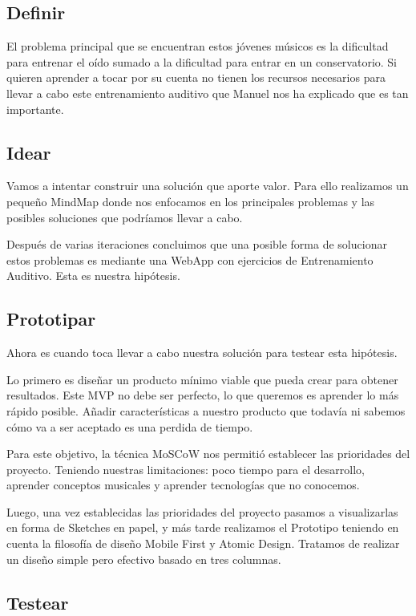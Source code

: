 \documentclass[12pt,twoside,titlepage]{report}
\begin{document}
{\subsection{Definir}

El problema principal que se encuentran estos jóvenes músicos es la dificultad para entrenar el oído sumado a la dificultad para entrar en un conservatorio. Si quieren aprender a tocar por su cuenta no tienen los recursos necesarios para llevar a cabo este entrenamiento auditivo que Manuel nos ha explicado que es tan importante.

\subsection{Idear}

Vamos a intentar construir una solución que aporte valor. Para ello realizamos un pequeño MindMap donde nos enfocamos en los principales problemas y las posibles soluciones que podríamos llevar a cabo.

Después de varias iteraciones concluimos que una posible forma de solucionar estos problemas es mediante una WebApp con ejercicios de Entrenamiento Auditivo. Esta es nuestra hipótesis.

\subsection{Prototipar}

Ahora es cuando toca llevar a cabo nuestra solución para testear esta hipótesis. 

Lo primero es diseñar un producto mínimo viable que pueda crear para obtener resultados. Este MVP no debe ser perfecto, lo que queremos es aprender lo más rápido posible. Añadir características a nuestro producto que todavía ni sabemos cómo va a ser aceptado es una perdida de tiempo. 

Para este objetivo, la técnica MoSCoW nos permitió establecer las prioridades del proyecto. Teniendo nuestras limitaciones: poco tiempo para el desarrollo, aprender conceptos musicales y aprender tecnologías que no conocemos.

Luego, una vez establecidas las prioridades del proyecto pasamos a visualizarlas en forma de Sketches en papel, y más tarde realizamos el Prototipo teniendo en cuenta la filosofía de diseño Mobile First y Atomic Design. Tratamos de realizar un diseño simple pero efectivo basado en tres columnas.

\subsection{Testear}

}
\end{document}
